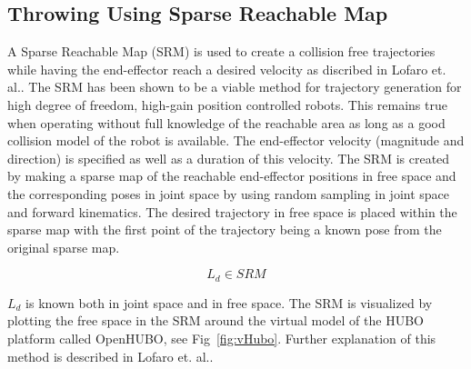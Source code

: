 \subsection{\bf Throwing Using Sparse Reachable Map}\label{sec:sec:srm}

A Sparse Reachable Map (SRM) is used to create a collision free trajectories while having the end-effector reach a desired velocity as discribed in Lofaro et. al.\cite{dlofaro-srm}.
The SRM has been shown to be a viable method for trajectory generation for high degree of freedom, high-gain position controlled robots.  This remains true when operating without full knowledge of the reachable area as long as a good collision model of the robot is available. 
The end-effector velocity (magnitude and direction) is specified as well as a duration of this velocity. 
The SRM is created by making a sparse map of the reachable end-effector positions in free space and the corresponding poses in joint space by using random sampling in joint space and forward kinematics. 
The desired trajectory in free space is placed within the sparse map with the first point of the trajectory being a known pose from the original sparse map. 

\begin{equation}
L_d \in SRM
\end{equation}

$L_d$ is known both in joint space and in free space.
The SRM is visualized by plotting the free space in the SRM around the virtual model of the HUBO platform called OpenHUBO, see Fig~\ref{fig:vHubo}.
Further explanation of this method is described in Lofaro et. al.\cite{dlofaro-srm}.

